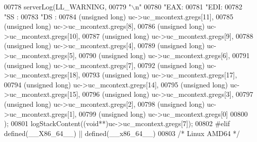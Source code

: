 \begin{DoxyCode}
{{{{{{{{{{{{{{{{{{{{{{{{{{{{{{{{{{{{{{{{{{{{{{{{{{{{{00778     serverLog(LL\_WARNING,
00779     \textcolor{stringliteral}{"\(\backslash\)n"}
00780     \textcolor{stringliteral}{"EAX:%
00781     \textcolor{stringliteral}{"EDI:%
00782     \textcolor{stringliteral}{"SS :%
00783     \textcolor{stringliteral}{"DS :%
00784         (\textcolor{keywordtype}{unsigned} \textcolor{keywordtype}{long}) uc->uc\_mcontext.gregs[11],
00785         (\textcolor{keywordtype}{unsigned} \textcolor{keywordtype}{long}) uc->uc\_mcontext.gregs[8],
00786         (\textcolor{keywordtype}{unsigned} \textcolor{keywordtype}{long}) uc->uc\_mcontext.gregs[10],
00787         (\textcolor{keywordtype}{unsigned} \textcolor{keywordtype}{long}) uc->uc\_mcontext.gregs[9],
00788         (\textcolor{keywordtype}{unsigned} \textcolor{keywordtype}{long}) uc->uc\_mcontext.gregs[4],
00789         (\textcolor{keywordtype}{unsigned} \textcolor{keywordtype}{long}) uc->uc\_mcontext.gregs[5],
00790         (\textcolor{keywordtype}{unsigned} \textcolor{keywordtype}{long}) uc->uc\_mcontext.gregs[6],
00791         (\textcolor{keywordtype}{unsigned} \textcolor{keywordtype}{long}) uc->uc\_mcontext.gregs[7],
00792         (\textcolor{keywordtype}{unsigned} \textcolor{keywordtype}{long}) uc->uc\_mcontext.gregs[18],
00793         (\textcolor{keywordtype}{unsigned} \textcolor{keywordtype}{long}) uc->uc\_mcontext.gregs[17],
00794         (\textcolor{keywordtype}{unsigned} \textcolor{keywordtype}{long}) uc->uc\_mcontext.gregs[14],
00795         (\textcolor{keywordtype}{unsigned} \textcolor{keywordtype}{long}) uc->uc\_mcontext.gregs[15],
00796         (\textcolor{keywordtype}{unsigned} \textcolor{keywordtype}{long}) uc->uc\_mcontext.gregs[3],
00797         (\textcolor{keywordtype}{unsigned} \textcolor{keywordtype}{long}) uc->uc\_mcontext.gregs[2],
00798         (\textcolor{keywordtype}{unsigned} \textcolor{keywordtype}{long}) uc->uc\_mcontext.gregs[1],
00799         (\textcolor{keywordtype}{unsigned} \textcolor{keywordtype}{long}) uc->uc\_mcontext.gregs[0]
00800     );
00801     logStackContent((\textcolor{keywordtype}{void}**)uc->uc\_mcontext.gregs[7]);
00802     \textcolor{preprocessor}{#}\textcolor{preprocessor}{elif} \textcolor{preprocessor}{defined}\textcolor{preprocessor}{(}\textcolor{preprocessor}{\_\_X86\_64\_\_}\textcolor{preprocessor}{)} \textcolor{preprocessor}{||} \textcolor{preprocessor}{defined}\textcolor{preprocessor}{(}\_\_x86\_64\_\_\textcolor{preprocessor}{)}
00803     \textcolor{comment}{/* Linux AMD64 */}
}}}}}}}}}}}}}}}}}}}}}}}}}}}}}}}}}}}}}}}}}}}}}}}}}}}}}}}}}
\end{DoxyCode}
